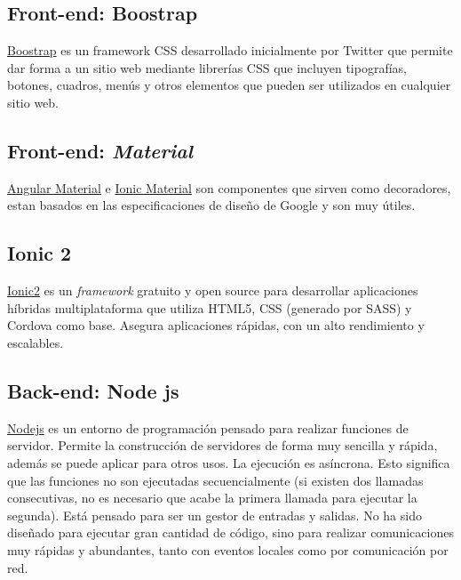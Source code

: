 \subsection{Front-end: Boostrap}\label{tecnologias_boostrap}
\href{https://www.getbootstrap.com/}{Boostrap} es un framework CSS desarrollado inicialmente  por Twitter que permite dar forma a un sitio web mediante librerías CSS que incluyen tipografías, botones, cuadros, menús y otros elementos que pueden ser utilizados en cualquier sitio web.


\subsection{Front-end: \emph{Material}}\label{tecnologias_material}
\href{https://material.angular.io/}{Angular Material} e \href{http://ionicmaterial.com/}{Ionic Material}  son componentes que sirven como decoradores, estan basados en las especificaciones de diseño de Google y son muy útiles.

\subsection{ Ionic 2}\label{tecnologias_ionic2}
\href{https://ionicframework.com/}{Ionic2} es un \emph{framework} gratuito y open source para desarrollar aplicaciones híbridas multiplataforma que utiliza HTML5, CSS (generado por SASS) y Cordova como base. Asegura aplicaciones rápidas, con un alto rendimiento y escalables.


\subsection{Back-end: Node js}\label{tecnologias_nodejs}
\href{https://nodejs.org/}{Nodejs} es un entorno de programación pensado para realizar funciones de servidor. Permite la construcción de servidores de forma muy sencilla y rápida, además se puede aplicar para otros usos. La ejecución es asíncrona. Esto significa que las funciones no son ejecutadas secuencialmente (si existen dos llamadas consecutivas, no es necesario que acabe la primera llamada para ejecutar la segunda).
Está pensado para ser un gestor de entradas y salidas. No ha sido diseñado para ejecutar gran cantidad de código, sino para realizar comunicaciones muy rápidas y abundantes, tanto con eventos locales como por comunicación por red.

